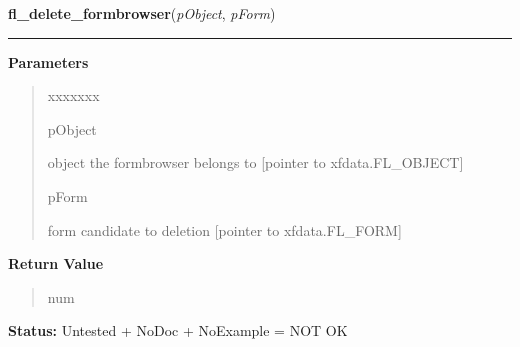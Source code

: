 \hspace{.8\funcindent}\begin{boxedminipage}{\funcwidth}

    \raggedright \textbf{fl\_delete\_formbrowser}(\textit{pObject}, \textit{pForm})

    \vspace{-1.5ex}

    \rule{\textwidth}{0.5\fboxrule}
\setlength{\parskip}{2ex}
\setlength{\parskip}{1ex}
      \textbf{Parameters}
      \vspace{-1ex}

      \begin{quote}
        \begin{Ventry}{xxxxxxx}

          \item[pObject]

          object the formbrowser belongs to [pointer to xfdata.FL\_OBJECT]

          \item[pForm]

          form candidate to deletion [pointer to xfdata.FL\_FORM]

        \end{Ventry}

      \end{quote}

      \textbf{Return Value}
    \vspace{-1ex}

      \begin{quote}
      num

      \end{quote}

\textbf{Status:} Untested + NoDoc + NoExample = NOT OK



    \end{boxedminipage}

    \label{xformslib:library:fl_replace_formbrowser}

    \vspace{0.5ex}

